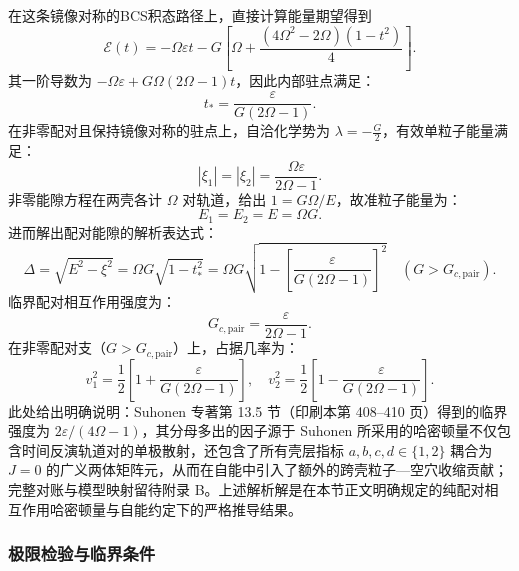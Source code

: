 在这条镜像对称的BCS积态路径上，直接计算能量期望得到
\begin{equation}\label{eq:2-3-35}
\mathcal E(t)=-\Omega\varepsilon t-G\left[\Omega+\frac{(4\Omega^2-2\Omega)(1-t^2)}4\right].
\end{equation}
其一阶导数为 $-\Omega\varepsilon+G\Omega(2\Omega-1)t$，因此内部驻点满足：
\begin{equation}\label{eq:2-3-36}
t_* = \frac{\varepsilon}{G(2\Omega - 1)}.
\end{equation}
在非零配对且保持镜像对称的驻点上，自洽化学势为 $\lambda = -\frac{G}{2}$，有效单粒子能量满足：
\begin{equation}\label{eq:2-3-37}
|\xi_1| = |\xi_2| = \frac{\Omega \varepsilon}{2\Omega - 1}.
\end{equation}
非零能隙方程在两壳各计 $\Omega$ 对轨道，给出 $1=G\Omega/E$，故准粒子能量为：
\begin{equation}\label{eq:2-3-38}
E_1 = E_2 = E = \Omega G.
\end{equation}
进而解出配对能隙的解析表达式：
\begin{equation}\label{eq:2-3-39}
\Delta = \sqrt{E^2 - \xi^2} = \Omega G \sqrt{1 - t_*^2} = \Omega G \sqrt{1 - \left[ \frac{\varepsilon}{G(2\Omega - 1)} \right]^2} \quad (G > G_{c,\mathrm{pair}}).
\end{equation}
临界配对相互作用强度为：
\begin{equation}\label{eq:2-3-40}
G_{c,\mathrm{pair}} = \frac{\varepsilon}{2\Omega - 1}.
\end{equation}
在非零配对支（$G > G_{c,\mathrm{pair}}$）上，占据几率为：
\begin{equation}\label{eq:2-3-41}
v_1^2 = \frac{1}{2} \left[ 1 + \frac{\varepsilon}{G(2\Omega - 1)} \right], \quad v_2^2 = \frac{1}{2} \left[ 1 - \frac{\varepsilon}{G(2\Omega - 1)} \right].
\end{equation}
此处给出明确说明：Suhonen 专著第 13.5 节（印刷本第 408–410 页）得到的临界强度为 $2\varepsilon/(4\Omega - 1)$，其分母多出的因子源于 Suhonen 所采用的哈密顿量不仅包含时间反演轨道对的单极散射，还包含了所有壳层指标 $a,b,c,d \in \{1,2\}$ 耦合为 $J=0$ 的广义两体矩阵元，从而在自能中引入了额外的跨壳粒子—空穴收缩贡献；完整对账与模型映射留待附录 B。上述解析解是在本节正文明确规定的纯配对相互作用哈密顿量与自能约定下的严格推导结果。


\subsubsection{极限检验与临界条件}\label{sec:2-3-极限检验与临界条件}


